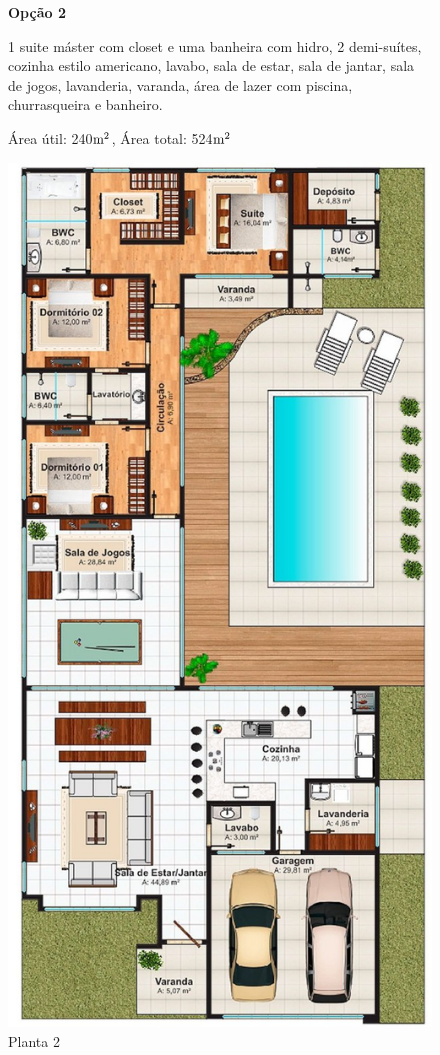 \begin{figure}
\textbf{Opção 2}

	1 suite máster com closet e uma banheira com hidro, 2 demi-suítes, cozinha estilo americano, lavabo, sala de estar, sala de jantar, sala de jogos, lavanderia, varanda, área de lazer com piscina, churrasqueira e banheiro.

Área útil: 240$\textup{m}^{2}$, Área total: 524$\textup{m}^{2}$
\begin{center}
\includegraphics[keepaspectratio,scale=0.5]{figuras/planta2.eps}
\caption{Planta 2\cite{planta2}}
\end{center}

\end{figure}

